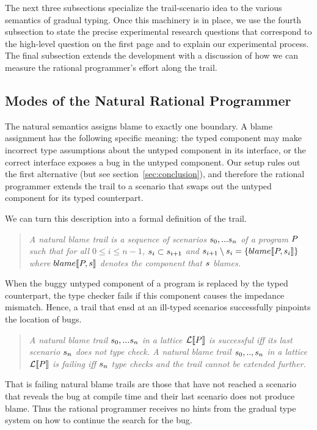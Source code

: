 
The next three subsections specialize the trail-scenario idea to the
various semantics of gradual typing. Once this machinery is in place,
we use the fourth subsection to state the precise experimental
research questions that correspond to the high-level question on the
first page and to explain our experimental process. The final
subsection extends the development with a discussion of how we can
measure the rational programmer's effort along the trail. 


\subsection{Modes of the Natural Rational Programmer} \label{sub:natural}

The natural semantics assigns blame to exactly one boundary.  A blame assignment
has the following specific meaning: the typed component may make incorrect type
assumptions about the untyped component in its interface, or the correct
interface exposes a bug in the untyped component. Our setup rules out the first
alternative (but see section~\ref{sec:conclusion}), and therefore the rational
programmer extends the trail to a scenario that swaps out the untyped component
for its typed counterpart.

We can turn this description into a formal definition of the trail. 
\begin{quote}
\it A \emph{natural blame trail} is a sequence of scenarios $s_0,...s_n$ of
a program $P$ such that for all $0 \leq i \leq n - 1$, $s_i \subset
s_{i+1}$ and $s_{i+1} \setminus s_i =\{blame\llbracket P, s_i\rrbracket\}$ where
$blame\llbracket P, s\rrbracket$ denotes the component that $s$ blames.
\end{quote}

When the buggy untyped component of a program is replaced by the typed counterpart,
the type checker fails if this component causes the impedance mismatch. Hence, a
trail that ensd at an ill-typed scenarios successfully pinpoints the location of
bugs. 
\begin{quote}
\it A natural blame trail $s_0,...s_n$ in a lattice $\mathcal{L}\llbracket P\rrbracket$ is
\emph{successful} iff its last scenario $s_n$ does not type check.  A natural
blame trail $s_0,..,s_n$ in a lattice $\mathcal{L}\llbracket P\rrbracket$ is \emph{failing}
iff $s_n$ type checks and the trail cannot be extended further.
\end{quote}
That is failing natural blame trails are those that have not reached a scenario that
reveals the bug at compile time and their last scenario does not produce blame. Thus
the rational programmer receives no hints from the gradual type system on how to
continue the search for the bug.

